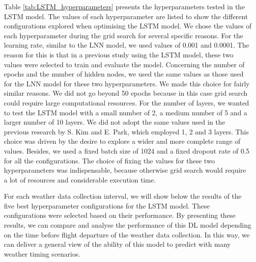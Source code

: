 \documentclass[12pt,oneside]{book} %
\begin{document}
\noindent Table \ref{tab:LSTM_hyperparameters} presents the hyperparameters tested in the LSTM model. The values of each hyperparameter are listed to show the different configurations explored when optimising the LSTM model. We chose the values of each hyperparameter during the grid search for several specific reasons. For the learning rate, similar to the LNN model, we used values of 0.001 and 0.0001. The reason for this is that in a previous study using the LSTM model, these two values were selected to train and evaluate the model. Concerning the number of epochs and the number of hidden nodes, we used the same values as those used for the LNN model for these two hyperparameters. We made this choice for fairly similar reasons. We did not go beyond 50 epochs because in this case grid search could require large computational resources. For the number of layers, we wanted to test the LSTM model with a small number of 2, a medium number of 5 and a larger number of 10 layers. We did not adopt the same values used in the previous research by S. Kim and E. Park, which employed 1, 2 and 3 layers. This choice was driven by the desire to explore a wider and more complete range of values. Besides, we used a fixed batch size of 1024 and a fixed dropout rate of 0.5 for all the configurations. The choice of fixing the values for these two hyperparameters was indispensable, because otherwise grid search would require a lot of resources and considerable execution time.

\noindent For each weather data collection interval, we will show below the results of the five best hyperparameter configurations for the LSTM model. These configurations were selected based on their performance. By presenting these results, we can compare and analyse the performance of this DL model depending on the time before flight departure of the weather data collection. In this way, we can deliver a general view of the ability of this model to predict with many weather timing scenarios.
\end{document}
